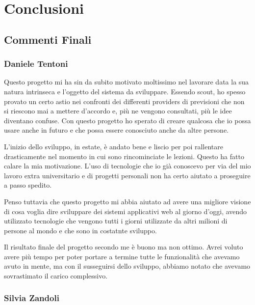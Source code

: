 
\chapter{Conclusioni}
    
    \section{Commenti Finali}
        
        \subsection{Daniele Tentoni}
        
        Questo progetto mi ha sin da subito motivato moltissimo nel lavorare data la sua natura intrinseca e l'oggetto del sistema da sviluppare. Essendo scout, ho spesso provato un certo astio nei confronti dei differenti providers di previsioni che non si riescono mai a mettere d'accordo e, più ne vengono consultati, più le idee diventano confuse. Con questo progetto ho sperato di creare qualcosa che io possa usare anche in futuro e che possa essere conosciuto anche da altre persone.
        
        L'inizio dello sviluppo, in estate, è andato bene e liscio per poi rallentare drasticamente nel momento in cui sono rincominciate le lezioni. Questo ha fatto calare la mia motivazione. L'uso di tecnologie che io già conoscevo per via del mio lavoro extra universitario e di progetti personali non ha certo aiutato a proseguire a passo spedito.
        
        Penso tuttavia che questo progetto mi abbia aiutato ad avere una migliore visione di cosa voglia dire sviluppare dei sistemi applicativi web al giorno d'oggi, avendo utilizzato tecnologie che vengono tutti i giorni utilizzate da altri milioni di persone al mondo e che sono in costatnte sviluppo.
        
        Il risultato finale del progetto secondo me è buono ma non ottimo. Avrei voluto avere più tempo per poter portare a termine tutte le funzionalità che avevamo avuto in mente, ma con il susseguirsi dello sviluppo, abbiamo notato che avevamo sovrastimato il carico complessivo.
        
        \subsection{Silvia Zandoli}
        
